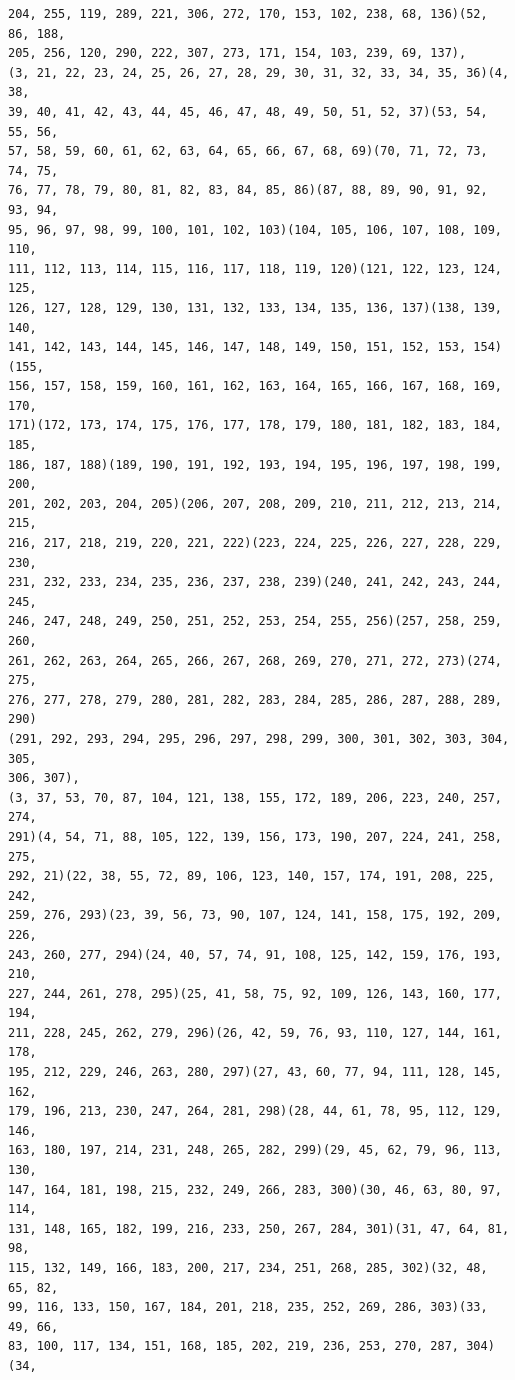 \begin{verbatim}
204, 255, 119, 289, 221, 306, 272, 170, 153, 102, 238, 68, 136)(52, 86, 188, 
205, 256, 120, 290, 222, 307, 273, 171, 154, 103, 239, 69, 137), 
(3, 21, 22, 23, 24, 25, 26, 27, 28, 29, 30, 31, 32, 33, 34, 35, 36)(4, 38, 
39, 40, 41, 42, 43, 44, 45, 46, 47, 48, 49, 50, 51, 52, 37)(53, 54, 55, 56, 
57, 58, 59, 60, 61, 62, 63, 64, 65, 66, 67, 68, 69)(70, 71, 72, 73, 74, 75, 
76, 77, 78, 79, 80, 81, 82, 83, 84, 85, 86)(87, 88, 89, 90, 91, 92, 93, 94, 
95, 96, 97, 98, 99, 100, 101, 102, 103)(104, 105, 106, 107, 108, 109, 110, 
111, 112, 113, 114, 115, 116, 117, 118, 119, 120)(121, 122, 123, 124, 125, 
126, 127, 128, 129, 130, 131, 132, 133, 134, 135, 136, 137)(138, 139, 140, 
141, 142, 143, 144, 145, 146, 147, 148, 149, 150, 151, 152, 153, 154)(155, 
156, 157, 158, 159, 160, 161, 162, 163, 164, 165, 166, 167, 168, 169, 170, 
171)(172, 173, 174, 175, 176, 177, 178, 179, 180, 181, 182, 183, 184, 185, 
186, 187, 188)(189, 190, 191, 192, 193, 194, 195, 196, 197, 198, 199, 200, 
201, 202, 203, 204, 205)(206, 207, 208, 209, 210, 211, 212, 213, 214, 215, 
216, 217, 218, 219, 220, 221, 222)(223, 224, 225, 226, 227, 228, 229, 230, 
231, 232, 233, 234, 235, 236, 237, 238, 239)(240, 241, 242, 243, 244, 245, 
246, 247, 248, 249, 250, 251, 252, 253, 254, 255, 256)(257, 258, 259, 260, 
261, 262, 263, 264, 265, 266, 267, 268, 269, 270, 271, 272, 273)(274, 275, 
276, 277, 278, 279, 280, 281, 282, 283, 284, 285, 286, 287, 288, 289, 290)
(291, 292, 293, 294, 295, 296, 297, 298, 299, 300, 301, 302, 303, 304, 305, 
306, 307), 
(3, 37, 53, 70, 87, 104, 121, 138, 155, 172, 189, 206, 223, 240, 257, 274, 
291)(4, 54, 71, 88, 105, 122, 139, 156, 173, 190, 207, 224, 241, 258, 275, 
292, 21)(22, 38, 55, 72, 89, 106, 123, 140, 157, 174, 191, 208, 225, 242, 
259, 276, 293)(23, 39, 56, 73, 90, 107, 124, 141, 158, 175, 192, 209, 226, 
243, 260, 277, 294)(24, 40, 57, 74, 91, 108, 125, 142, 159, 176, 193, 210, 
227, 244, 261, 278, 295)(25, 41, 58, 75, 92, 109, 126, 143, 160, 177, 194, 
211, 228, 245, 262, 279, 296)(26, 42, 59, 76, 93, 110, 127, 144, 161, 178, 
195, 212, 229, 246, 263, 280, 297)(27, 43, 60, 77, 94, 111, 128, 145, 162, 
179, 196, 213, 230, 247, 264, 281, 298)(28, 44, 61, 78, 95, 112, 129, 146, 
163, 180, 197, 214, 231, 248, 265, 282, 299)(29, 45, 62, 79, 96, 113, 130, 
147, 164, 181, 198, 215, 232, 249, 266, 283, 300)(30, 46, 63, 80, 97, 114, 
131, 148, 165, 182, 199, 216, 233, 250, 267, 284, 301)(31, 47, 64, 81, 98, 
115, 132, 149, 166, 183, 200, 217, 234, 251, 268, 285, 302)(32, 48, 65, 82, 
99, 116, 133, 150, 167, 184, 201, 218, 235, 252, 269, 286, 303)(33, 49, 66, 
83, 100, 117, 134, 151, 168, 185, 202, 219, 236, 253, 270, 287, 304)(34, 

\end{verbatim}
